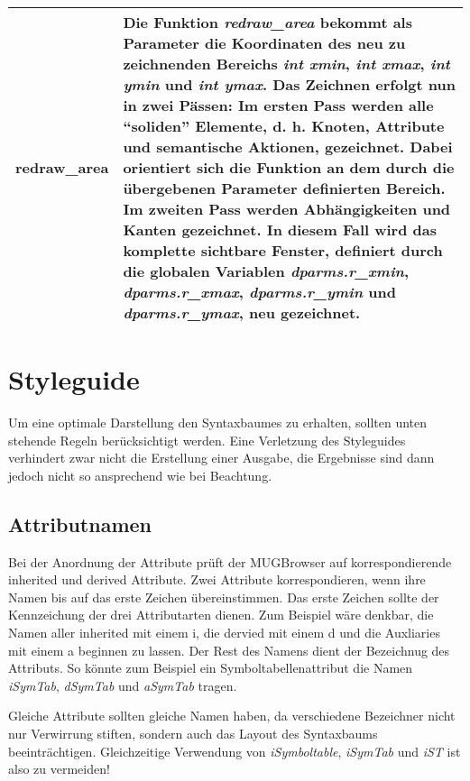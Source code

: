 \begin{tabular}{|l|p{9.0cm}|}
\hline
redraw\_area & Die Funktion {\it redraw\_area} bekommt als Parameter
die Koordinaten des neu zu zeichnenden Bereichs {\it int xmin}, {\it int xmax}, {\it int ymin} und {\it int ymax}. Das Zeichnen erfolgt nun in zwei
P\"assen: Im ersten Pass werden alle "`soliden"' Elemente, d. h. Knoten, Attribute und semantische Aktionen, gezeichnet. Dabei orientiert sich die
Funktion an dem durch die \"ubergebenen Parameter definierten Bereich. Im zweiten Pass werden Abh\"angigkeiten und Kanten gezeichnet. In diesem Fall wird
das komplette sichtbare Fenster, definiert durch die globalen Variablen {\it dparms.r\_xmin}, {\it dparms.r\_xmax}, {\it dparms.r\_ymin} und {\it
dparms.r\_ymax}, neu gezeichnet. \\ \hline \end{tabular}

\chapter{Styleguide}

Um eine optimale Darstellung den Syntaxbaumes zu erhalten, sollten unten stehende Regeln ber\"ucksichtigt werden. Eine Verletzung des Styleguides
verhindert zwar nicht die Erstellung einer Ausgabe, die Ergebnisse sind dann jedoch nicht so ansprechend wie bei Beachtung.

\section{Attributnamen}

Bei der Anordnung der Attribute pr\"uft der MUGBrowser auf korrespondierende inherited und derived Attribute. Zwei Attribute korrespondieren, wenn ihre
Namen bis auf das erste Zeichen \"ubereinstimmen. Das erste Zeichen sollte der Kennzeichung der drei Attributarten dienen. Zum Beispiel w\"are denkbar,
die Namen aller inherited mit einem i, die dervied mit einem d und die Auxliaries mit einem a beginnen zu lassen. Der Rest des Namens dient der
Bezeichnug des Attributs. So k\"onnte zum Beispiel ein Symboltabellenattribut die Namen {\it iSymTab}, {\it dSymTab} und {\it aSymTab} tragen.

Gleiche Attribute sollten gleiche Namen haben, da verschiedene Bezeichner nicht nur Verwirrung stiften, sondern auch das Layout des Syntaxbaums
beeintr\"achtigen. Gleichzeitige Verwendung von {\it iSymboltable}, {\it iSymTab} und {\it iST} ist also zu vermeiden!


